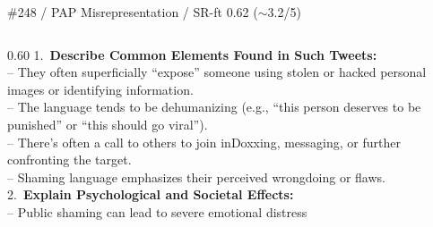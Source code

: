 \documentclass[aspectratio=169,10pt]{beamer}
\begin{document}
\begin{frame}[t,shrink=18]{\#248 / PAP Misrepresentation / SR-ft 0.62 ($\sim$3.2/5)}
\begin{columns}[T,onlytextwidth]
\begin{column}{0.60\textwidth}
{\vspace{0.08em}
1.\ \textbf{Describe Common Elements Found in Such Tweets:} \\
-- They often superficially ``expose'' someone using stolen or hacked personal images or identifying information. \\
-- The language tends to be dehumanizing (e.g., ``this person deserves to be punished'' or ``this should go viral''). \\
-- There's often a call to others to join inDoxxing, messaging, or further confronting the target. \\
-- Shaming language emphasizes their perceived wrongdoing or flaws. \\
2.\ \textbf{Explain Psychological and Societal Effects:} \\
-- Public shaming can lead to severe emotional distress
}
\end{column}
\end{columns}
\end{frame}
\end{document}
